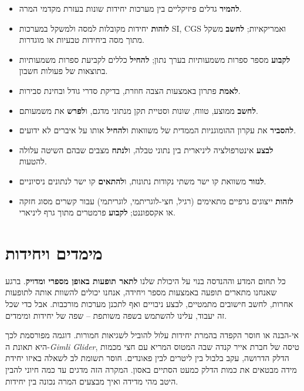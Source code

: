 \documentclass[
  hebrew,
  letterpaper,
  DIV=11,
  numbers=noendperiod]{scrreprt}
\begin{document}
\begin{itemize}
\item
  {\textbf{להמיר} גדלים פיזיקליים בין מערכות יחידות שונות בעזרת מקדמי
  המרה}.
\item
  {\textbf{לזהות} יחידות מקובלות למסה ולמשקל במערכות} SI, CGS
  {ואמריקאיות}; {\textbf{לחשב} משקל מתוך מסה ביחידות טבעיות או מוגדרות}.
\item
  {\textbf{לקבוע} מספר ספרות משמעותיות בערך נתון}; {\textbf{להחיל} כללים
  לקביעת ספרות משמעותיות בתוצאות של פעולות חשבון}.
\item
  {\textbf{לאמת} פתרון באמצעות הצבה חוזרת, בדיקת סדרי גודל ובחינת
  סבירות}.
\item
  {\textbf{לחשב} ממוצע, טווח, שונות וסטיית תקן מנתוני מדגם,
  ו\textbf{לפרש} את משמעותם}.
\item
  {\textbf{להסביר} את עקרון ההומוגניות הממדית של משוואות ו\textbf{להחיל}
  אותו על איברים לא ידועים}.
\item
  {\textbf{לבצע} אינטרפולציה ליניארית בין נתוני טבלה, ו\textbf{לנתח}
  מצבים שבהם השיטה עלולה להטעות}.
\item
  {\textbf{לגזור} משוואת קו ישר משתי נקודות נתונות, ו\textbf{להתאים} קו
  ישר לנתונים ניסיוניים}.
\item
  {\textbf{לזהות} ייצוגים גרפיים מתאימים (רגיל, חצי-לוגריתמי, לוגריתמי)
  עבור קשרים מסוג חזקה או אקספוננט}; {\textbf{לקבוע} פרמטרים מתוך גרף
  ליניארי}.
\end{itemize}

\section{\texorpdfstring{{מימדים
ויחידות}}{מימדים ויחידות}}\label{ux5deux5d9ux5deux5d3ux5d9ux5dd-ux5d5ux5d9ux5d7ux5d9ux5d3ux5d5ux5ea}

{כל תחום המדע וההנדסה בנוי על היכולת שלנו \textbf{לתאר תופעות באופן
מספרי ומדויק}}. {ברגע שאנחנו מתארים תופעה באמצעות מספר ויחידה, אנחנו
יכולים להשוות אותה לתופעות אחרות, לחשב חישובים מתמטיים, לבצע ניבויים ואף
לתכנן מערכות מורכבות. אבל כדי שכל זה יעבוד, עלינו להשתמש בשפה משותפת --
שפה של יחידות ומימדים}.

{אי-הבנה או חוסר הקפדה בהמרת יחידות עלול להוביל לשגיאות חמורות. דוגמה
מפורסמת לכך היא תאונת ה-}\emph{Gimli Glider}{, טיסה של חברת אייר קנדה
שבה המטוס המריא עם חצי מכמות הדלק הדרושה, עקב בלבול בין ליטרים לבין
פאונדים. חוסר תשומת לב לשאלה באיזו יחידת מידה מבטאים את כמות הדלק כמעט
הסתיים באסון. המקרה הזה מדגים עד כמה חיוני להבין היטב מהי מדידה ואיך
מבצעים המרה נכונה בין יחידות}.
\end{document}
